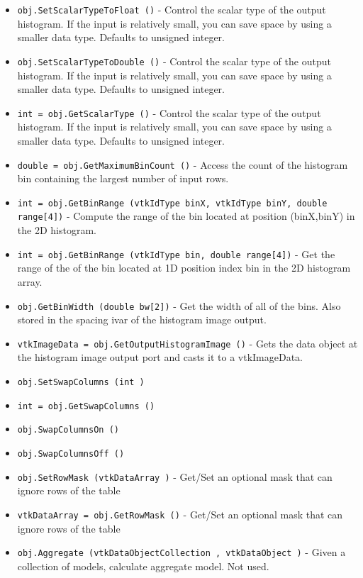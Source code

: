 \begin{itemize}
\item  \verb|obj.SetScalarTypeToFloat ()| -  Control the scalar type of the output histogram.  If the input
 is relatively small, you can save space by using a smaller
 data type.  Defaults to unsigned integer.

\item  \verb|obj.SetScalarTypeToDouble ()| -  Control the scalar type of the output histogram.  If the input
 is relatively small, you can save space by using a smaller
 data type.  Defaults to unsigned integer.

\item  \verb|int = obj.GetScalarType ()| -  Control the scalar type of the output histogram.  If the input
 is relatively small, you can save space by using a smaller
 data type.  Defaults to unsigned integer.

\item  \verb|double = obj.GetMaximumBinCount ()| -  Access the count of the histogram bin containing the largest number
 of input rows.

\item  \verb|int = obj.GetBinRange (vtkIdType binX, vtkIdType binY, double range[4])| -  Compute the range of the bin located at position (binX,binY) in
 the 2D histogram.

\item  \verb|int = obj.GetBinRange (vtkIdType bin, double range[4])| -  Get the range of the of the bin located at 1D position index bin
 in the 2D histogram array.

\item  \verb|obj.GetBinWidth (double bw[2])| -  Get the width of all of the bins. Also stored in the spacing
 ivar of the histogram image output.

\item  \verb|vtkImageData = obj.GetOutputHistogramImage ()| -  Gets the data object at the histogram image output port and
 casts it to a vtkImageData.

\item  \verb|obj.SetSwapColumns (int )|

\item  \verb|int = obj.GetSwapColumns ()|

\item  \verb|obj.SwapColumnsOn ()|

\item  \verb|obj.SwapColumnsOff ()|

\item  \verb|obj.SetRowMask (vtkDataArray )| -  Get/Set an optional mask that can ignore rows of the table

\item  \verb|vtkDataArray = obj.GetRowMask ()| -  Get/Set an optional mask that can ignore rows of the table

\item  \verb|obj.Aggregate (vtkDataObjectCollection , vtkDataObject )| -  Given a collection of models, calculate aggregate model. Not used.

\end{itemize}
